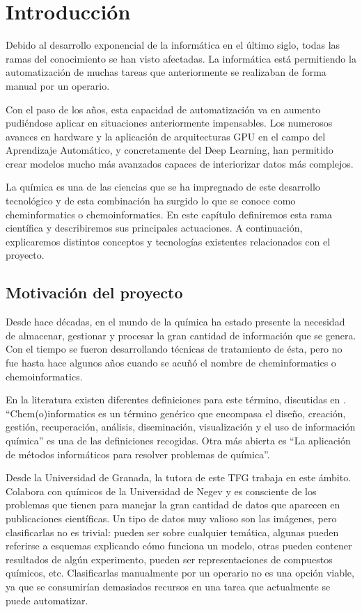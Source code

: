 \chapter{Introducción}

Debido al desarrollo exponencial de la informática en el último siglo, todas las ramas del conocimiento se han visto afectadas. La informática está permitiendo la automatización de muchas tareas que anteriormente se realizaban de forma manual por un operario. 

Con el paso de los años, esta capacidad de automatización va en aumento pudiéndose aplicar en situaciones anteriormente impensables. Los numerosos avances en hardware y la aplicación de arquitecturas GPU en el campo del Aprendizaje Automático, y concretamente del Deep Learning, han permitido crear modelos mucho más avanzados capaces de interiorizar datos más complejos. 

La química es una de las ciencias que se ha impregnado de este desarrollo tecnológico y de esta combinación ha surgido lo que se conoce como cheminformatics o chemoinformatics. En este capítulo definiremos esta rama científica y describiremos sus principales actuaciones. A continuación, explicaremos distintos conceptos y tecnologías existentes relacionados con el proyecto.

\section{Motivación del proyecto}
Desde hace décadas, en el mundo de la química ha estado presente la necesidad de almacenar, gestionar y procesar la gran cantidad de información que se genera. Con el tiempo se fueron desarrollando técnicas de tratamiento de ésta, pero no fue hasta hace algunos años cuando se acuñó el nombre de cheminformatics o chemoinformatics. 

En la literatura existen diferentes definiciones para este término, discutidas en \cite{doi:10.1021/ci600234z}. \\
``Chem(o)informatics es un término genérico que encompasa el diseño, creación, gestión, recuperación, análisis, diseminación, visualización y el uso de información química'' es una de las definiciones recogidas. Otra más abierta es ``La aplicación de métodos informáticos para resolver problemas de química''. 

Desde la Universidad de Granada, la tutora de este TFG trabaja en este ámbito. Colabora con químicos de la Universidad de Negev y es consciente de los problemas que tienen para manejar la gran cantidad de datos que aparecen en publicaciones científicas. Un tipo de datos muy valioso son las imágenes, pero clasificarlas no es trivial: pueden ser sobre cualquier temática, algunas pueden referirse a esquemas explicando cómo funciona un modelo, otras pueden contener resultados de algún experimento, pueden ser representaciones de compuestos químicos, etc. Clasificarlas manualmente por un operario no es una opción viable, ya que se consumirían demasiados recursos en una tarea que actualmente se puede automatizar.


